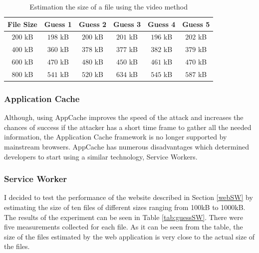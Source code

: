 \documentclass[10pt,a4paper,twoside]{book}
\begin{document}
\begin{table}[t]
\centering
\begin{tabular}{|c|c|c|c|c|c|}
\hline
\textbf{File Size} & \textbf{Guess 1} & \textbf{Guess 2} & \textbf{Guess 3} & \textbf{Guess 4} & \textbf{Guess 5} \\
\hline
$200$ kB & $198$ kB & $200$ kB & $201$ kB & $196$ kB & $202$ kB \\
\hline
$400$ kB & $360$ kB & $378$ kB & $377$ kB & $382$ kB & $379$ kB \\
\hline
$600$ kB & $470$ kB & $480$ kB & $450$ kB & $461$ kB & $470$ kB \\
\hline
$800$ kB & $541$ kB & $520$ kB & $634$ kB & $545$ kB & $587$ kB \\
\hline
\end{tabular}
\caption{Estimation the size of a file using the video method}
\label{tab:guessVideo}
\end{table}

\subsubsection{Application Cache}
Although, using AppCache improves the speed of the attack and increases the chances of success if the attacker has a short time frame to gather all the needed information, the Application Cache framework is no longer supported by mainstream browsers. AppCache has numerous disadvantages which determined developers to start using a similar technology, Service Workers.

\subsubsection{Service Worker}

I decided to test the performance of the website described in Section \ref{webSW} by estimating the size of ten files of different sizes ranging from 100kB to 1000kB. The results of the experiment can be seen in Table \ref{tab:guessSW}. There were five measurements collected for each file. As it can be seen from the table, the size of the files estimated by the web application is very close to the actual size of the files.
\end{document}
